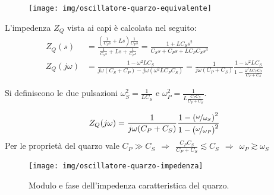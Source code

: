 \begin{figure}[tbh]
	\centering
	\texttt{[image: img/oscillatore-quarzo-equivalente]}
	\caption{}
	\label{fig:oscillatore-quarzo-equivalente}
\end{figure}

L'impedenza $Z_Q$ vista ai capi è calcolata nel seguito:
$$\begin{aligned}
Z_Q(s) &=
 \frac{\left( \frac{1}{C_S s} + Ls\right)
 \frac{1}{C_P s}}{\frac{1}{C_S s} + Ls+
 \frac{1}{C_P s}}
	  =
	  \frac{1 + LC_Ss^2}{C_Ss+C_Ps+LC_PC_Ss^3}\\
 	Z_Q(j \omega) &=
 	\frac{1 - \omega^2 LC_S}{j \omega (C_S + C_P) - j\omega (\omega^2 L C_P C_S)}
 	=
 	\frac{1}{j\omega (C_P+C_S)}
 	\frac{1-\omega^2 LC_S}{1 - \frac{\omega^2 L C_P C_S }{C_P + C_S}}
\end{aligned}
$$

Si definiscono le due pulsazioni $\omega_S^2 = \frac{1}{LC_S}$ e $\omega_P^2 = \frac{1}{L\frac{C_PC_S}{C_P + C_S}}$.

$$
Z_Q(j\omega) = \frac{1}{j\omega (C_P+C_S)}
\frac{1-\left(\nicefrac{\omega}{\omega_S}\right)^2}{1 - \left(\nicefrac{\omega}{\omega_P}\right)^2}
$$
Per le proprietà del quarzo vale $C_P \gg C_S
~~ \Rightarrow ~~ \frac{C_PC_S}{C_P+C_S} \lesssim C_S
~~ \Rightarrow ~~ \omega_P \gtrsim \omega_S$
\begin{figure}[hbt]
	\centering
	\texttt{[image: img/oscillatore-quarzo-impedenza]}
	\caption{Modulo e fase dell'impedenza caratteristica del quarzo.}
	\label{fig:quarzo}
\end{figure}


